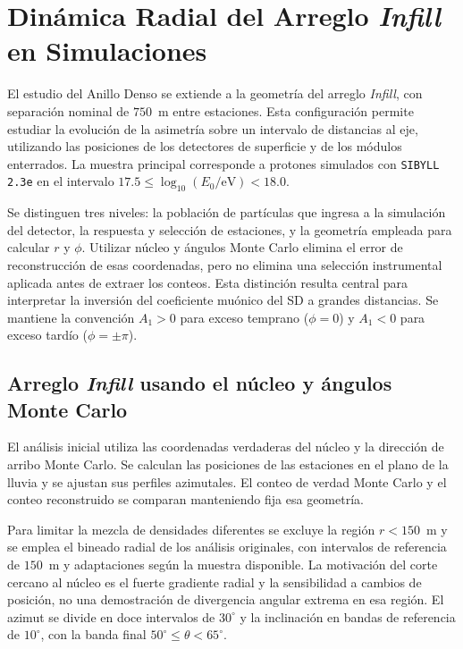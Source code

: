 
\section{Dinámica Radial del Arreglo \textit{Infill} en Simulaciones}
\label{cap:infill}

El estudio del Anillo Denso se extiende a la geometría del arreglo \textit{Infill}, con separación nominal de $750$~m entre estaciones. Esta configuración permite estudiar la evolución de la asimetría sobre un intervalo de distancias al eje, utilizando las posiciones de los detectores de superficie y de los módulos enterrados. La muestra principal corresponde a protones simulados con \texttt{SIBYLL 2.3e} en el intervalo $17.5\leq\log_{10}(E_0/\mathrm{eV})<18.0$.

Se distinguen tres niveles: la población de partículas que ingresa a la simulación del detector, la respuesta y selección de estaciones, y la geometría empleada para calcular $r$ y $\phi$. Utilizar núcleo y ángulos Monte Carlo elimina el error de reconstrucción de esas coordenadas, pero no elimina una selección instrumental aplicada antes de extraer los conteos. Esta distinción resulta central para interpretar la inversión del coeficiente muónico del SD a grandes distancias. Se mantiene la convención $A_1>0$ para exceso temprano ($\phi=0$) y $A_1<0$ para exceso tardío ($\phi=\pm\pi$).

\subsection{Arreglo \textit{Infill} usando el núcleo y ángulos Monte Carlo}
\label{subsec:infill_mc}

El análisis inicial utiliza las coordenadas verdaderas del núcleo y la dirección de arribo Monte Carlo. Se calculan las posiciones de las estaciones en el plano de la lluvia y se ajustan sus perfiles azimutales. El conteo de verdad Monte Carlo y el conteo reconstruido se comparan manteniendo fija esa geometría.

Para limitar la mezcla de densidades diferentes se excluye la región $r<150$~m y se emplea el bineado radial de los análisis originales, con intervalos de referencia de $150$~m y adaptaciones según la muestra disponible. La motivación del corte cercano al núcleo es el fuerte gradiente radial y la sensibilidad a cambios de posición, no una demostración de divergencia angular extrema en esa región. El azimut se divide en doce intervalos de $30^\circ$ y la inclinación en bandas de referencia de $10^\circ$, con la banda final $50^\circ\leq\theta<65^\circ$.

